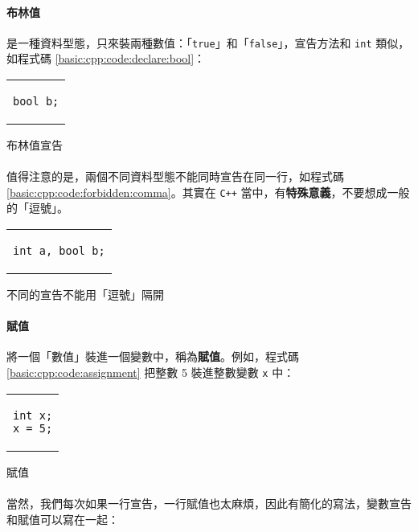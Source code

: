 \documentclass[12pt,a4paper,oneside]{article}
\begin{document}
\begin{CJK}{UTF8}{bkai}
\paragraph{布林值}是一種資料型態，只來裝兩種數值：「\lstinline!true!」和「\lstinline!false!」，宣告方法和 \lstinline!int! 類似，如程式碼 \ref{basic:cpp:code:declare:bool}：

\begin{code}[h!]
\centering
\begin{tabular}{c}
\begin{lstlisting}
bool b;
\end{lstlisting}
\end{tabular}
\caption{布林值宣告}
\label{basic:cpp:code:declare:bool}
\end{code}

\paragraph{}值得注意的是，兩個不同資料型態不能同時宣告在同一行，如程式碼 \ref{basic:cpp:code:forbidden:comma}。其實在 \texttt{C++} 當中，有\textbf{特殊意義}，不要想成一般的「逗號」。

\begin{code}[h!]
\centering
\begin{tabular}{c}
\begin{lstlisting}
int a, bool b;
\end{lstlisting}
\end{tabular}
\caption{不同的宣告不能用「逗號」隔開}
\label{basic:cpp:code:forbidden:comma}
\end{code}

\paragraph{賦值}將一個「數值」裝進一個變數中，稱為\textbf{賦值}。例如，程式碼 \ref{basic:cpp:code:assignment} 把整數 5 裝進整數變數 \lstinline!x! 中：

\begin{code}[h!]
\centering
\begin{tabular}{c}
\begin{lstlisting}
int x;
x = 5;
\end{lstlisting}
\end{tabular}
\caption{賦值}
\label{basic:cpp:code:assignment}
\end{code}

\paragraph{}當然，我們每次如果一行宣告，一行賦值也太麻煩，因此有簡化的寫法，變數宣告和賦值可以寫在一起：


\end{CJK}
\end{document}
